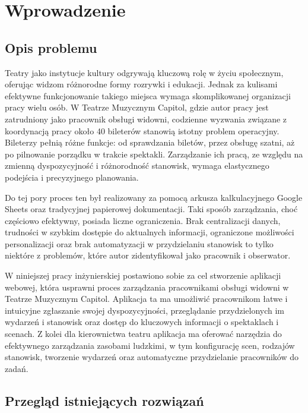 \documentclass[shortabstract]{iithesis}
\author         {Adam Jarząbek}
\date          {14 czerwca 2024}                     %
\begin{document}

\chapter{Wprowadzenie}

\section{Opis problemu}

Teatry jako instytucje kultury odgrywają kluczową rolę w życiu społecznym, oferując widzom różnorodne formy rozrywki i edukacji. Jednak za kulisami efektywne funkcjonowanie takiego miejsca wymaga skomplikowanej organizacji pracy wielu osób. W Teatrze Muzycznym Capitol, gdzie autor pracy jest zatrudniony jako pracownik obsługi widowni, codzienne wyzwania związane z koordynacją pracy około 40 bileterów stanowią istotny problem operacyjny. Bileterzy pełnią różne funkcje:  od sprawdzania biletów, przez obsługę szatni, aż po pilnowanie porządku w trakcie spektakli. Zarządzanie ich pracą, ze względu na zmienną dyspozycyjność i różnorodność stanowisk, wymaga elastycznego podejścia i precyzyjnego planowania.

Do tej pory proces ten był realizowany za pomocą arkusza kalkulacyjnego Google Sheets oraz tradycyjnej papierowej dokumentacji. Taki sposób zarządzania, choć częściowo efektywny, posiada liczne ograniczenia. Brak centralizacji danych, trudności w szybkim dostępie do aktualnych informacji, ograniczone możliwości personalizacji oraz brak automatyzacji w przydzielaniu stanowisk to tylko niektóre z problemów, które autor zidentyfikował jako pracownik i obserwator.

W niniejszej pracy inżynierskiej postawiono sobie za cel stworzenie aplikacji webowej, która usprawni proces zarządzania pracownikami obsługi widowni w Teatrze Muzycznym Capitol. Aplikacja ta ma umożliwić pracownikom łatwe i intuicyjne zgłaszanie swojej dyspozycyjności, przeglądanie przydzielonych im wydarzeń i stanowisk oraz dostęp do kluczowych informacji o spektaklach i scenach. Z kolei dla kierownictwa teatru aplikacja ma oferować narzędzia do efektywnego zarządzania zasobami ludzkimi, w tym konfigurację scen, rodzajów stanowisk, tworzenie wydarzeń oraz automatyczne przydzielanie pracowników do zadań.


\section{Przegląd istniejących rozwiązań}
\end{document}
